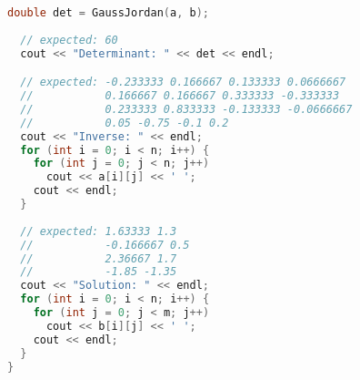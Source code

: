 \begin{lstlisting}[language=C++]
  double det = GaussJordan(a, b);
  
  // expected: 60  
  cout << "Determinant: " << det << endl;

  // expected: -0.233333 0.166667 0.133333 0.0666667
  //           0.166667 0.166667 0.333333 -0.333333
  //           0.233333 0.833333 -0.133333 -0.0666667
  //           0.05 -0.75 -0.1 0.2
  cout << "Inverse: " << endl;
  for (int i = 0; i < n; i++) {
    for (int j = 0; j < n; j++)
      cout << a[i][j] << ' ';
    cout << endl;
  }
  
  // expected: 1.63333 1.3
  //           -0.166667 0.5
  //           2.36667 1.7
  //           -1.85 -1.35
  cout << "Solution: " << endl;
  for (int i = 0; i < n; i++) {
    for (int j = 0; j < m; j++)
      cout << b[i][j] << ' ';
    cout << endl;
  }
}
\end{lstlisting}
